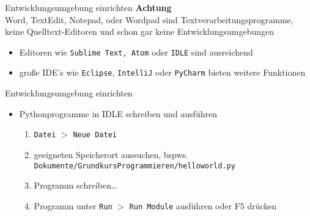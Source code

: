\begin{frame}{Entwicklungsumgebung einrichten}
    \textbf{Achtung}\\
        Word, TextEdit, Notepad, oder Wordpad sind Textverarbeitungsprogramme, keine 
        Quelltext-Editoren und schon gar keine Entwicklungsumgebungen
   
    \begin{itemize}
        \item Editoren wie \texttt{Sublime Text, Atom} oder \texttt{IDLE} sind 
         ausreichend
        \item große IDE's wie \texttt{Eclipse}, \texttt{IntelliJ} oder \texttt{PyCharm} 
        bieten weitere Funktionen
    \end{itemize}
\end{frame}

\begin{frame}{Entwicklungsumgebung einrichten}
    \begin{itemize}
        \item Pythonprogramme in IDLE schreiben und ausführen
            \begin{enumerate}
                \item\texttt{Datei} $>$ \texttt{Neue Datei}
                \item geeigneten Speicherort aussuchen, bspws. \texttt{Dokumente/GrundkursProgrammieren/helloworld.py}
                \item Programm schreiben\dots
                \item Programm unter \texttt{Run} $>$ \texttt{Run Module} ausführen oder F5 drücken
            \end{enumerate}
    \end{itemize}
\end{frame}

